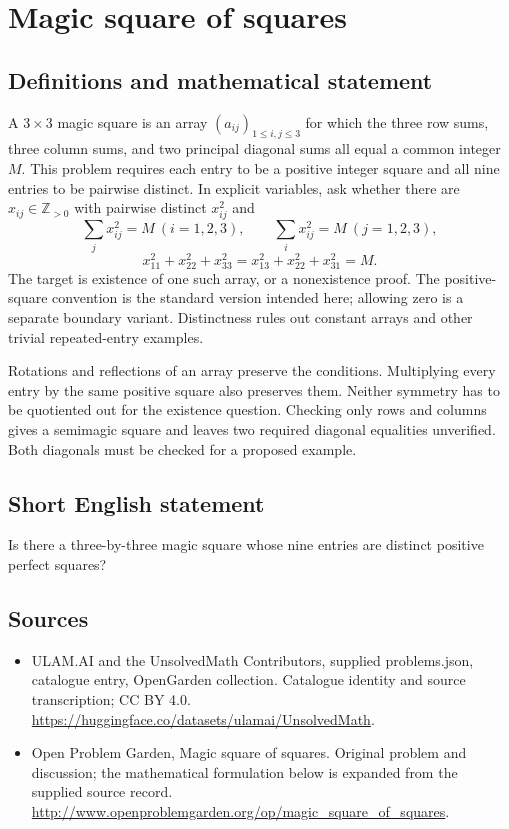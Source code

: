 \documentclass[11pt,a4paper]{article}
\begin{document}
\section*{Magic square of squares}\label{statement}

\subsection{Definitions and mathematical statement}
A $3\times3$ magic square is an array $(a_{ij})_{1\le i,j\le3}$
for which the three row sums, three column sums, and two principal
diagonal sums all equal a common integer $M$. This problem requires
each entry to be a positive integer square and all nine entries to
be pairwise distinct. In explicit variables, ask whether there are
$x_{ij}\in\mathbb Z_{>0}$ with pairwise distinct $x_{ij}^2$ and
\[
 \sum_jx_{ij}^2=M\ (i=1,2,3),\qquad
 \sum_ix_{ij}^2=M\ (j=1,2,3),
\]
\[
 x_{11}^2+x_{22}^2+x_{33}^2
       =x_{13}^2+x_{22}^2+x_{31}^2=M.
\]
The target is existence of one such array, or a nonexistence proof.
The positive-square convention is the standard version intended
here; allowing zero is a separate boundary variant. Distinctness
rules out constant arrays and other trivial repeated-entry examples.

Rotations and reflections of an array preserve the conditions.
Multiplying every entry by the same positive square also preserves
them. Neither symmetry has to be quotiented out for the existence
question. Checking only rows and columns gives a semimagic square
and leaves two required diagonal equalities unverified. Both
diagonals must be checked for a proposed example.
\subsection{Short English statement}
Is there a three-by-three magic square whose nine entries are distinct positive perfect squares?
\subsection{Sources}
\begin{itemize}
\item[S1] ULAM.AI and the UnsolvedMath Contributors, supplied problems.json, catalogue entry, OpenGarden collection. Catalogue identity and source transcription; CC BY 4.0.
\url{https://huggingface.co/datasets/ulamai/UnsolvedMath}.
\item[S2] Open Problem Garden, Magic square of squares. Original problem and discussion; the mathematical formulation below is expanded from the supplied source record.
\url{http://www.openproblemgarden.org/op/magic_square_of_squares}.
\end{itemize}
\end{document}
